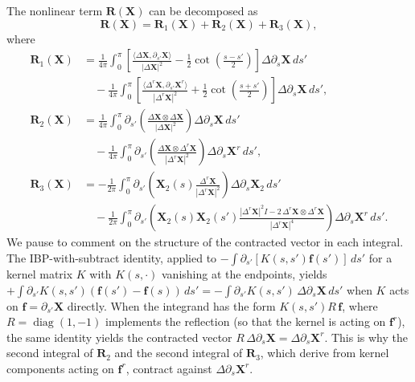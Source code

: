 \documentclass{amsart}
\begin{document}
The nonlinear term $\mathbf{R}(\mathbf{X})$ can be decomposed as
\[
\mathbf{R}(\mathbf{X})
=
\mathbf{R}_1(\mathbf{X})
+
\mathbf{R}_2(\mathbf{X})
+
\mathbf{R}_3(\mathbf{X}),
\]
where
\begin{align*}
\mathbf{R}_1(\mathbf{X})
&=
\frac{1}{4\pi} \int_{0}^{\pi}
\left[
\frac{\langle \Delta \mathbf{X}, \partial_{s'} \mathbf{X} \rangle}
{|\Delta \mathbf{X}|^2}
-
\frac{1}{2}\cot\left(\frac{s-s'}{2}\right)
\right]
\Delta \partial_s \mathbf{X}\, ds' \\
&\quad
-
\frac{1}{4\pi} \int_{0}^{\pi}
\left[
\frac{\langle \Delta^r \mathbf{X}, \partial_{s'} \mathbf{X}^r \rangle}
{|\Delta^r \mathbf{X}|^2}
+
\frac{1}{2}\cot\left(\frac{s+s'}{2}\right)
\right]
\Delta \partial_s \mathbf{X}\, ds' ,
\\[0.5em]
\mathbf{R}_2(\mathbf{X})
&=
\frac{1}{4\pi}\int_{0}^{\pi}
\partial_{s'}\left(
\frac{\Delta \mathbf{X}\otimes \Delta \mathbf{X}}
{|\Delta \mathbf{X}|^2}
\right)
\Delta \partial_s \mathbf{X}\, ds' \\
&\quad
-
\frac{1}{4\pi}\int_{0}^{\pi}
\partial_{s'}\left(
\frac{\Delta \mathbf{X}\otimes \Delta^r \mathbf{X}}
{|\Delta^r \mathbf{X}|^2}
\right)
\Delta \partial_s \mathbf{X}^r\, ds' ,
\\[0.5em]
\mathbf{R}_3(\mathbf{X})
&=
-\frac{1}{2\pi}\int_{0}^{\pi}
\partial_{s'}\left(
\mathbf{X}_2(s)\frac{\Delta^r \mathbf{X}}{|\Delta^r \mathbf{X}|^2}
\right)
\Delta \partial_s \mathbf{X}_2\, ds' \\
&\quad
-
\frac{1}{2\pi}\int_{0}^{\pi}
\partial_{s'}\left(
\mathbf{X}_2(s)\mathbf{X}_2(s')
\frac{|\Delta^r \mathbf{X}|^2 I - 2\,\Delta^r \mathbf{X}\otimes \Delta^r \mathbf{X}}
{|\Delta^r \mathbf{X}|^4}
\right)
\Delta \partial_s \mathbf{X}^r\, ds' .
\end{align*}
We pause to comment on the structure of the contracted vector in each integral.  The IBP-with-subtract identity, applied to $-\int \partial_{s'}[K(s,s')\mathbf{f}(s')]\,ds'$ for a kernel matrix $K$ with $K(s,\cdot)$ vanishing at the endpoints, yields $+\int \partial_{s'}K(s,s')(\mathbf{f}(s')-\mathbf{f}(s))\,ds' = -\int \partial_{s'}K(s,s')\,\Delta\partial_s\mathbf{X}\,ds'$ when $K$ acts on $\mathbf{f} = \partial_{s'}\mathbf{X}$ directly.  When the integrand has the form $K(s,s')R\,\mathbf{f}$, where $R = \operatorname{diag}(1,-1)$ implements the reflection (so that the kernel is acting on $\mathbf{f}^r$), the same identity yields the contracted vector $R\,\Delta\partial_s\mathbf{X} = \Delta\partial_s\mathbf{X}^r$.  This is why the second integral of $\mathbf{R}_2$ and the second integral of $\mathbf{R}_3$, which derive from kernel components acting on $\mathbf{f}^r$, contract against $\Delta\partial_s\mathbf{X}^r$.
\end{document}
